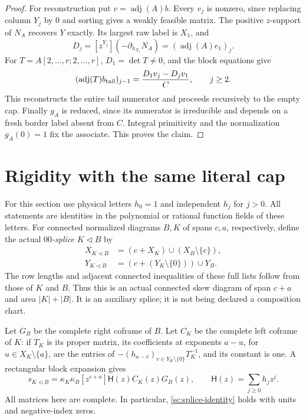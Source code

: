 \documentclass[11pt,a4paper]{amsart}
\numberwithin{equation}{section}
\theoremstyle{plain}
\theoremstyle{definition}
\begin{document}
\begin{proof}
For reconstruction put \(v=\operatorname{adj}(A)b\).  Every \(v_j\) is nonzero, since
replacing column \(Y_j\) by \(0\) and sorting gives a weakly feasible matrix.
The positive \(z\)-support of \(N_A\) recovers \(Y\) exactly.  Its largest raw
label is \(X_1\), and
\[
 D_j=[z^{Y_j}](-\partial_{h_{X_1}}N_A)
       =(\operatorname{adj}(A)e_1)_j.
\]
For \(T=A[2,\ldots,r;2,\ldots,r]\), \(D_1=\det T\ne0\), and the block equations
give
\[
 (\operatorname{adj}(T)b_{\rm tail})_{j-1}
       =\frac{D_1v_j-D_jv_1}{C},\qquad j\ge2.
\]
This reconstructs the entire tail numerator and proceeds recursively to
the empty cap.  Finally \(g_A\) is reduced, since its numerator is irreducible
and depends on a fresh border label absent from \(C\).  Integral primitivity
and the normalization \(g_A(0)=1\) fix the associate.  This proves the claim.
\end{proof}

\section{Rigidity with the same literal cap}\label{sec:fixed-caps}

For this section use physical letters \(h_0=1\) and independent
\(h_j\) for \(j>0\).  All statements are identities in the polynomial or
rational function fields of these letters.  For connected normalized
diagrams \(B,K\) of spans \(c,a\), respectively, define the actual
\emph{\(00\)-splice} \(K\mathbin{\triangleleft}B\) by
\begin{equation}\label{sc:splice-flags}
 \begin{split}
 X_{K\triangleleft B}&=(c+X_K)\cup(X_B\setminus\{c\}),\\
 Y_{K\triangleleft B}&=(c+(Y_K\setminus\{0\}))\cup Y_B.
 \end{split}
\end{equation}
The row lengths and adjacent connected inequalities of these full
lists follow from those of \(K\) and \(B\).  Thus this is an actual
connected skew diagram of span \(c+a\) and area \(|K|+|B|\).
It is an auxiliary splice; it is not being declared a composition
chart.

Let \(G_B\) be the complete right coframe of \(B\).  Let \(C_K\) be the
complete left coframe of \(K\): if \(T_K\) is its proper matrix, its
coefficients at exponents \(a-u\), for \(u\in X_K\setminus\{a\}\),
are the entries of
\(-(h_{a-v})_{v\in Y_K\setminus\{0\}}T_K^{-1}\), and its constant
is one.  A rectangular block expansion gives
\begin{equation}\label{sc:splice-identity}
 s_{K\triangleleft B}
   =\kappa_K\kappa_B[z^{c+a}]\mathsf H(z)C_K(z)G_B(z),
 \qquad \mathsf H(z)=\sum_{j\ge0}h_jz^j.
\end{equation}
All matrices here are complete.  In particular,
\eqref{sc:splice-identity} holds with units and negative-index zeros.
\end{document}
